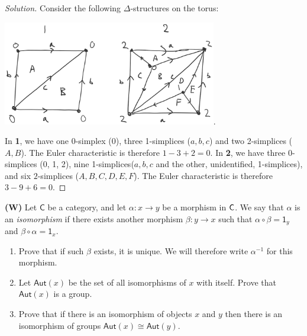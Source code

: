 \begin{proof}[Solution]
Consider the following $\Delta$-structures on the torus:
\begin{center}
    \includegraphics[width = 0.7\textwidth]{Picture1.png}.
\end{center}
In \textbf{1}, we have one 0-simplex (0), three 1-simplices ($a, b, c$) and two 2-simplices ($A, B$). The Euler characteristic is therefore $1-3+2=0$. In \textbf{2}, we have three 0-simplices (0, 1, 2), nine 1-simplices($a, b, c$ and the other, unidentified, 1-simplices), and six $2$-simplices ($A, B, C, D, E, F$). The Euler characteristic is therefore $3-9+6 = 0$. 
\end{proof}

\newpage


\begin{problem}
\textbf{(W)} Let $\mathsf{C}$ be a category, and let $\alpha: x\to y$ be a morphism in $\mathsf{C}$. We say that $\alpha$ is an \emph{isomorphism} if there exists another morphism $\beta: y \to x$ such that $\alpha \circ \beta = \mathsf{1}_y$ and $\beta \circ  \alpha  = \mathsf{1}_x$.
\begin{enumerate}[font=\normalfont,label=\textbf{(\alph*)}]
\item Prove that if such $\beta$ exists, it is unique. We will therefore write $\alpha^{-1}$ for this morphism. 

\item Let $\mathsf{Aut}(x)$ be the set of all isomorphisms of $x$ with itself. Prove that $\mathsf{Aut}(x)$ is a group.

\item Prove that if there is an isomorphism of objects $x$ and $y$ then there is an isomorphism of groups  $\mathsf{Aut}(x) \cong \mathsf{Aut}(y)$. 
\end{enumerate}
\end{problem}


